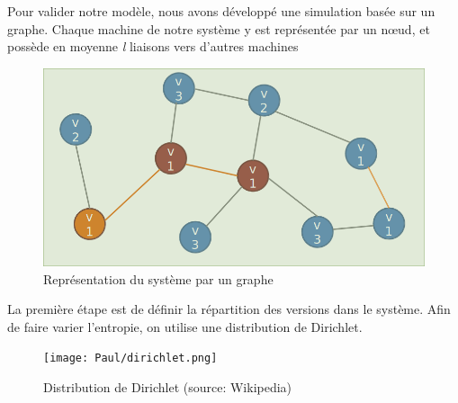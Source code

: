 Pour valider notre modèle, nous avons développé une simulation basée sur un graphe.
Chaque machine de notre système y est représentée par un nœud, et possède en moyenne \textit{l} liaisons vers d'autres machines

\begin{figure}[ht]
\centering
     \includegraphics[width=1.0\linewidth]{Paul/python/graph.png}
     \caption{Représentation du système par un graphe}
     \label{normal_case}
\end{figure}

La première étape est de définir la répartition des versions dans le système. Afin de faire varier l'entropie, on utilise une distribution de Dirichlet.

\begin{figure}[ht]
\centering
     \texttt{[image: Paul/dirichlet.png]}
     \caption{Distribution de Dirichlet (source: Wikipedia)}
     \label{normal_case}
\end{figure}
